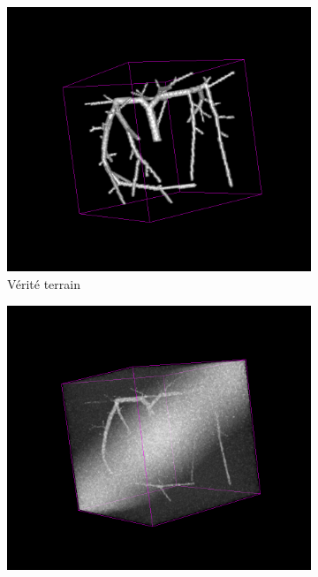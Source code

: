 \begin{figure}[!ht]
  \centering
  \begin{subfigure}{0.45\textwidth}
    \centering
    \includegraphics[width=\textwidth]{Images/vascu_v1_gt.png}
    \caption{Vérité terrain}
  \end{subfigure}
  \begin{subfigure}{0.45\textwidth}
    \centering
    \includegraphics[width=\textwidth]{Images/vascu_v1_original.png}

\end{subfigure}
\end{figure}
